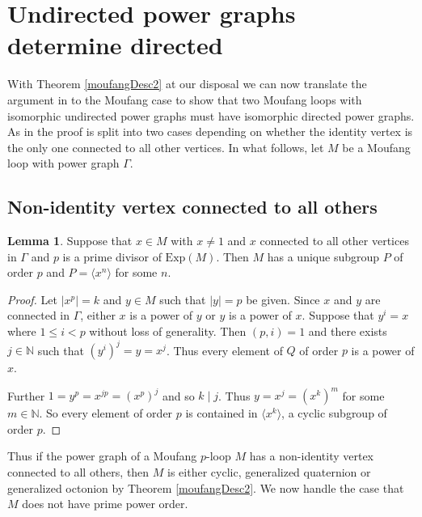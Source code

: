 \documentclass[12pt]{report}
\theoremstyle{definition}
\newtheorem{lem}[thm]{Lemma}
\newcommand{\Exp}{\text{Exp}}       %
\begin{document}

\section{Undirected power graphs determine directed} \label{gen-oct}

With Theorem \ref{moufangDesc2} at our disposal we can now translate the argument in \cite{PGII} to the
  Moufang case to show that two Moufang loops with isomorphic undirected power graphs must have isomorphic
  directed power graphs. As in \cite{PGII} the proof is split into two cases depending on whether the
  identity vertex is the only one connected to all other vertices. In what follows, let $M$ be a Moufang
  loop with power graph $\Gamma$.

\subsection{Non-identity vertex connected to all others}\label{multi-vert}

\begin{lem}\label{connectedVertex}
  Suppose that $x\in M$ with $x\neq 1$ and $x$ connected to all other vertices in $\Gamma$ and $p$ is a
    prime divisor of $\Exp(M)$. Then $M$ has a unique subgroup $P$ of order $p$ and
    $P = \langle x^n \rangle$ for some $n$.
\end{lem}

\begin{proof}
  Let $|x^p| = k$ and $y\in M$ such that $|y| = p$ be given. Since $x$ and $y$ are connected in
    $\Gamma$, either $x$ is a power of $y$ or $y$ is a power of $x$. Suppose that $y^i = x$
    where $1\leq i < p$ without loss of generality. Then $(p, i) = 1$ and there exists
    $j\in\mathbb{N}$ such that $(y^i)^j = y = x^j$. Thus every element of $Q$ of order $p$
    is a power of $x$.

  Further $1 = y^p = x^{jp} = (x^p)^j$ and so $k\mid j$. Thus $y = x^j = (x^k)^m$ for some
    $m\in \mathbb{N}$. So every element of order $p$ is contained in $\langle x^k\rangle$,
    a cyclic subgroup of order $p$.
\end{proof}

Thus if the power graph of a Moufang $p$-loop $M$ has a non-identity vertex connected to all
  others, then $M$ is either cyclic, generalized quaternion or generalized octonion by Theorem
  \ref{moufangDesc2}. We now handle the case that $M$ does not have prime power order.
\end{document}
